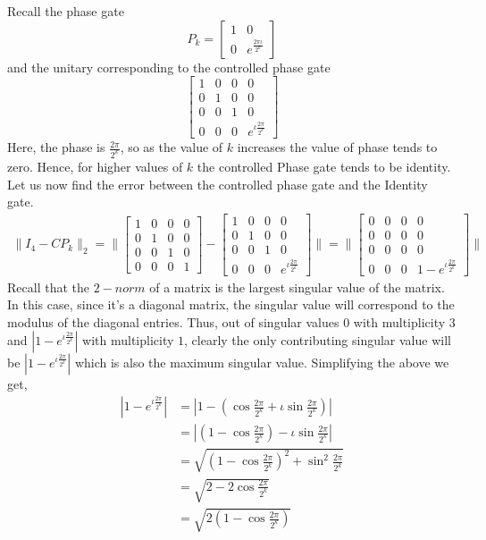 Recall the phase gate
\[
P_k = \begin{bmatrix}
    1 & 0 \\
    0 & e^{\frac{2\pi\iota}{2^k}}
\end{bmatrix}
\]
and the unitary corresponding to the controlled phase gate
\[
\begin{bmatrix}
    1 & 0 & 0 & 0 \\
    0 & 1 & 0 & 0 \\
    0 & 0 & 1 & 0 \\
    0 & 0 & 0 & e^{\iota\frac{2\pi}{2^k}}
\end{bmatrix}
\]
Here, the phase is $\frac{2\pi}{2^k}$, so as the value of $k$ increases the value of phase tends to zero. Hence, for higher values of $k$ the controlled Phase gate tends to be identity. Let us now find the error between the controlled phase gate and the Identity gate.
\begin{align*}
\|I_{4} - CP_k\|_2 =\|\begin{bmatrix}
    1 & 0 & 0 & 0 \\
    0 & 1 & 0 & 0 \\
    0 & 0 & 1 & 0 \\
    0 & 0 & 0 & 1 
\end{bmatrix} - \begin{bmatrix}
    1 & 0 & 0 & 0 \\
    0 & 1 & 0 & 0 \\
    0 & 0 & 1 & 0 \\
    0 & 0 & 0 & e^{\iota\frac{2\pi}{2^k}}
\end{bmatrix}\|=\|\begin{bmatrix}
    0 & 0 & 0 & 0 \\
    0 & 0 & 0 & 0 \\
    0 & 0 & 0 & 0 \\
    0 & 0 & 0 & 1-e^{\iota\frac{2\pi}{2^k}}
\end{bmatrix}\|
\end{align*}
Recall that the $2-norm$ of a matrix is the largest singular value of the matrix. In this case, since it's a diagonal matrix, the singular value will correspond to the modulus of the diagonal entries. Thus, out of singular values $0$ with multiplicity $3$ and $|1-e^{\iota\frac{2\pi}{2^k}}|$ with multiplicity $1$, clearly the only contributing singular value will be $|1-e^{\iota\frac{2\pi}{2^k}}|$ which is also the maximum singular value.
Simplifying the above we get,
\begin{align*}
    |1-e^{\iota\frac{2\pi}{2^k}}|&=|1-\left(\cos\frac{2\pi}{2^k}+\iota \sin \frac{2\pi}{2^k}\right)|\\
    &=|\left(1-\cos \frac{2\pi}{2^k}\right) -\iota \sin \frac{2\pi}{2^k}|\\
    &=\sqrt{\left(1-\cos\frac{2\pi}{2^k}\right)^2 + \sin^2 \frac{2\pi}{2^k}}\\
    &=\sqrt{2-2\cos\frac{2\pi}{2^k}}\\
    &=\sqrt{2\left(1-\cos \frac{2\pi}{2^k}\right)}
\end{align*}
